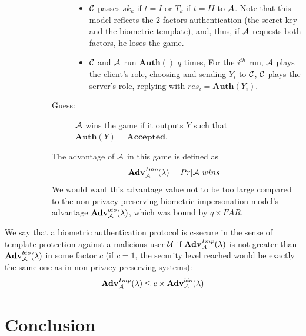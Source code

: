 \begin{description}
\begin{description}
\begin{description}
\begin{itemize}
      \item $\mathcal{C}$ passes $sk_k$ if $t = I$ or $T_k$ if $t = II$ to $\mathcal{A}$. Note that this model reflects
        the 2-factors authentication (the secret key and the biometric template), and, thus, if $\mathcal{A}$ requests both factors,
        he loses the game.
      \item $\mathcal{C}$ and $\mathcal{A}$ run $\mathbf{Auth()}$ $q$ times, For the $i^{th}$ run, $\mathcal{A}$ plays the
        client's role, choosing and sending $Y_i$ to $\mathcal{C}$, $\mathcal{C}$ plays the server's role, replying
        with $res_i = \mathbf{Auth}(Y_i)$.
      \end{itemize}
    \item[Guess:] $\mathcal{A}$ wins the game if it outputs $Y$ such that $\mathbf{Auth}(Y) = \textbf{Accepted}$.
    \end{description}
    The advantage of $\mathcal{A}$ in this game is defined as
    \[
      \textbf{Adv}^{Imp}_{\mathcal{A}}(\lambda) = Pr[\mathcal{A} \ wins] \
    \]
    We would want this advantage value not to be too large compared to the non-privacy-preserving biometric
    impersonation model's advantage $\textbf{Adv}^{bio}_{\mathcal{A}}(\lambda)$, which was bound by $q \times FAR$.

  \end{description}

\end{description}
\begin{definition}
   We say that a biometric authentication protocol is c-secure in the sense of template
  protection against a malicious user $\mathcal{U}$ if $\textbf{Adv}^{Imp}_{\mathcal{A}}(\lambda)$ is not greater than
  $\textbf{Adv}^{bio}_{\mathcal{A}}(\lambda)$ in some factor $c$ (if $c = 1$,  the security level reached would be exactly the same one 
  as in non-privacy-preserving systems):
  \[\textbf{Adv}^{Imp}_{\mathcal{A}}(\lambda) \leq c \times \textbf{Adv}^{bio}_{\mathcal{A}}(\lambda)\]
\end{definition}


\section{Conclusion}
